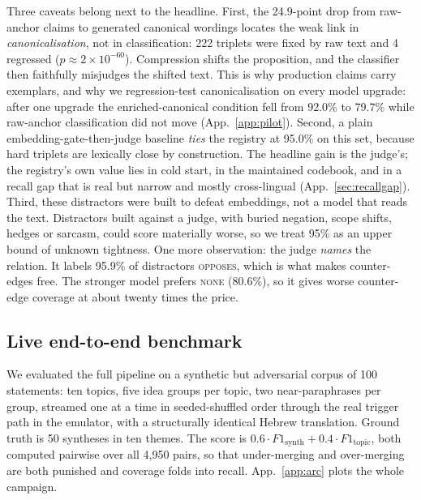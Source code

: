 \documentclass{article}
\begin{document}
Three caveats belong next to the headline. First, the 24.9-point drop from raw-anchor claims to generated canonical wordings locates the weak link in \emph{canonicalisation}, not in classification: 222 triplets were fixed by raw text and 4 regressed ($p\approx2\times10^{-60}$). Compression shifts the proposition, and the classifier then faithfully misjudges the shifted text. This is why production claims carry exemplars, and why we regression-test canonicalisation on every model upgrade: after one upgrade the enriched-canonical condition fell from 92.0\% to 79.7\% while raw-anchor classification did not move (App.~\ref{app:pilot}).\label{sec:pilot} Second, a plain embedding-gate-then-judge baseline \emph{ties} the registry at 95.0\% on this set, because hard triplets are lexically close by construction. The headline gain is the judge's; the registry's own value lies in cold start, in the maintained codebook, and in a recall gap that is real but narrow and mostly cross-lingual (App.~\ref{sec:recallgap}). Third, these distractors were built to defeat embeddings, not a model that reads the text. Distractors built against a judge, with buried negation, scope shifts, hedges or sarcasm, could score materially worse, so we treat 95\% as an upper bound of unknown tightness. One more observation: the judge \emph{names} the relation. It labels 95.9\% of distractors \textsc{opposes}, which is what makes counter-edges free. The stronger model prefers \textsc{none} (80.6\%), so it gives worse counter-edge coverage at about twenty times the price.

\subsection{Live end-to-end benchmark}
\label{sec:live}
We evaluated the full pipeline on a synthetic but adversarial corpus of 100 statements: ten topics, five idea groups per topic, two near-paraphrases per group, streamed one at a time in seeded-shuffled order through the real trigger path in the emulator, with a structurally identical Hebrew translation. Ground truth is 50 syntheses in ten themes. The score is $0.6\cdot F1_{\text{synth}}+0.4\cdot F1_{\text{topic}}$, both computed pairwise over all 4{,}950 pairs, so that under-merging and over-merging are both punished and coverage folds into recall. App.~\ref{app:arc} plots the whole campaign.
\end{document}
